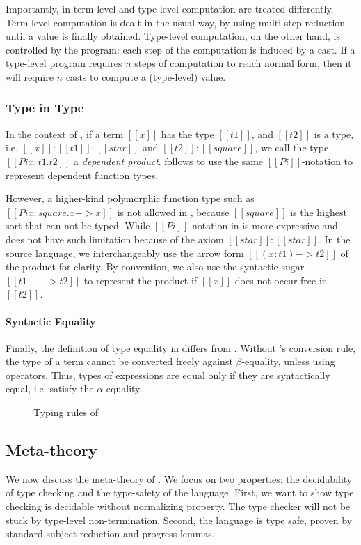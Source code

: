 Importantly, in \ecore term-level and type-level computation are treated 
differently. Term-level computation is dealt in the usual way, by 
using multi-step reduction until a value is finally obtained. 
Type-level computation, on the other hand, is controlled by the program:
each step of the computation is induced by a cast. If a type-level 
program requires $n$ steps of computation to reach normal form, 
then it will require $n$ casts to compute a (type-level) value.

\subsubsection{Type in Type}
In the context of \cc, if a term $[[x]]$ has the type $[[t1]]$, and
$[[t2]]$ is a type, i.e. $[[x]]:[[t1]]:[[star]]$ and
$[[t2]]:[[square]]$, we call the type $[[Pi x:t1.t2]]$ a
\emph{dependent product}. \ecore follows \cc to use the same
$[[Pi]]$-notation to represent dependent function types.

However, a higher-kind polymorphic function type such as $[[Pi
    x:square.x->x]]$ is not allowed in \cc, because $[[square]]$ is
the highest sort that can not be typed. While $[[Pi]]$-notation in
\ecore is more expressive and does not have such limitation because of
the axiom $[[star]]:[[star]]$. In the source language, we
interchangeably use the arrow form $[[(x:t1)->t2]]$ of the product for
clarity. By convention, we also use the syntactic sugar $[[t1 -->
    t2]]$ to represent the product if $[[x]]$ does not occur free in
$[[t2]]$.

\paragraph{Syntactic Equality}
Finally, the definition of type equality in \ecore differs from
\cc. Without \cc's conversion rule, the type of a term cannot be
converted freely against $\beta$-equality, unless using \cast
operators. Thus, types of expressions are equal only if they are
syntactically equal, i.e. satisfy the $\alpha$-equality.

\begin{figure}
    \ottdefnctx{}
    \ottdefnexpr{}
    \caption{Typing rules of \ecore}
    \label{fig:ecore:typing}
\end{figure}

\subsection{Meta-theory}\label{sec:ecore:meta}
We now discuss the meta-theory of \ecore. We focus on two properties: the decidability of type checking and the type-safety of the language. First, we want to show type checking \ecore is decidable without normalizing property. The type checker will not be stuck by type-level non-termination. Second, the language is type safe, proven by standard subject reduction and progress lemmas.

